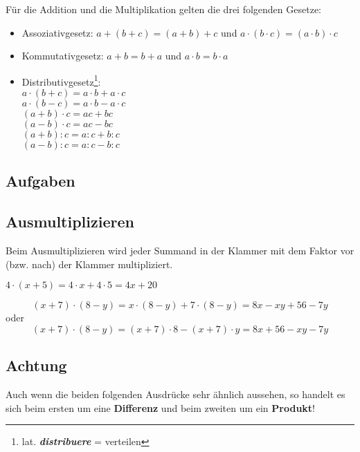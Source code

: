 Für die Addition und die Multiplikation gelten die drei folgenden
Gesetze:



\begin{gesetz}{}{}
\begin{itemize}
\item  Assoziativgesetz:
  $a+(b+c) = (a+b) +c$ und $a\cdot(b\cdot{}c) = (a\cdot b)\cdot c$
\item Kommutativgesetz:
  $a+b = b+a$ und $a\cdot b = b \cdot a$
\item Distributivgesetz\footnote{lat. \textit{\textbf{distribuere}} = verteilen}:\\
  $a\cdot (b+c) = a\cdot b + a\cdot c$\\
  $a\cdot (b-c) = a\cdot b - a\cdot c$\\
  $(a+b)\cdot c = ac + bc$\\
  $(a-b)\cdot c = ac - bc$\\
  $(a+b):c = a:c + b:c$\\
  $(a-b):c = a:c - b:c$\\
  
  \end{itemize}
\end{gesetz}

\subsection*{Aufgaben}


\newpage

\subsection{Ausmultiplizieren}
Beim Ausmultiplizieren wird jeder Summand in der Klammer mit dem
Faktor vor (bzw. nach) der Klammer multipliziert.
\begin{beispiel}{}{}
  $4\cdot (x + 5) = 4\cdot x + 4\cdot 5 = 4x + 20$
\end{beispiel}

\begin{beispiel}{}{}
  $$(x + 7)\cdot(8-y) = x\cdot(8-y) + 7\cdot(8-y) = 8x-xy+56-7y$$
  oder
  $$(x + 7)\cdot(8-y) = (x+7)\cdot 8 - (x+7)\cdot y = 8x+56-xy-7y$$
\end{beispiel}
\newpage

\subsection{Achtung}
Auch wenn die beiden folgenden Ausdrücke sehr ähnlich aussehen, so
handelt es sich beim ersten um eine \textbf{Differenz} und beim zweiten um
ein \textbf{Produkt}!

